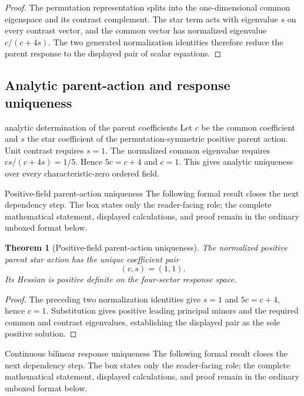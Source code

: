 \documentclass[11pt]{article}
\numberwithin{equation}{section}
\newtheorem{theorem}[definition]{Theorem}
\theoremstyle{remark}
\begin{document}
\begin{proof}
The permutation representation splits into the one-dimensional common eigenspace and its contrast complement.  The star term acts with eigenvalue $s$ on every contrast vector, and the common vector has normalized eigenvalue $c/(c+4s)$.  The two generated normalization identities therefore reduce the parent response to the displayed pair of scalar equations.
\end{proof}

\subsection{Analytic parent-action and response uniqueness}
\begin{conceptledger}{analytic determination of the parent coefficients}
Let $c$ be the common coefficient and $s$ the star coefficient of the permutation-symmetric positive parent action. Unit contrast requires $s=1$. The normalized common eigenvalue requires $cs/(c+4s)=1/5$. Hence $5c=c+4$ and $c=1$. This gives analytic uniqueness over every characteristic-zero ordered field.
\end{conceptledger}
\begin{proofguide}{Positive-field parent-action uniqueness}
The following formal result closes the next dependency step. The box states only the reader-facing role; the complete mathematical statement, displayed calculations, and proof remain in the ordinary unboxed format below.
\end{proofguide}
\begin{theorem}[Positive-field parent-action uniqueness]
The normalized positive parent star action has the unique coefficient pair
\begin{equation}
(c,s)=(1,1).
\end{equation}
Its Hessian is positive definite on the four-sector response space.
\end{theorem}
\begin{proof}
The preceding two normalization identities give $s=1$ and $5c=c+4$, hence $c=1$. Substitution gives positive leading principal minors and the required common and contrast eigenvalues, establishing the displayed pair as the sole positive solution.
\end{proof}
\begin{proofguide}{Continuous bilinear response uniqueness}
The following formal result closes the next dependency step. The box states only the reader-facing role; the complete mathematical statement, displayed calculations, and proof remain in the ordinary unboxed format below.
\end{proofguide}
\end{document}

